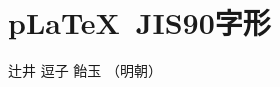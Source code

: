 \documentclass{jsarticle}
\begin{document}
\section{p\LaTeX~JIS90字形}

辻井 逗子 飴玉 （明朝）

\end{document}
